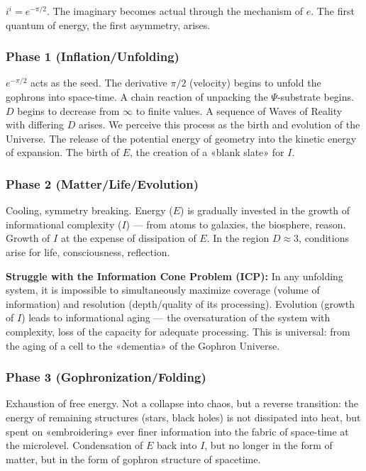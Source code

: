 \documentclass[a4paper,12pt]{article}
\begin{document}
	$i^i = e^{-\pi/2}$. The imaginary becomes actual through the mechanism of $e$. The first quantum of energy, the first asymmetry, arises.
	
	\subsubsection{Phase 1 (Inflation/Unfolding)}
	
	$e^{-\pi/2}$ acts as the seed. The derivative $\pi/2$ (velocity) begins to unfold the gophrons into space-time. A chain reaction of unpacking the $\Psi$-substrate begins. $D$ begins to decrease from $\infty$ to finite values. A sequence of Waves of Reality with differing $D$ arises. We perceive this process as the birth and evolution of the Universe. The release of the potential energy of geometry into the kinetic energy of expansion. The birth of $E$, the creation of a «blank slate» for $I$.
	
	\subsubsection{Phase 2 (Matter/Life/Evolution)}
	
	Cooling, symmetry breaking. Energy ($E$) is gradually invested in the growth of informational complexity ($I$) — from atoms to galaxies, the biosphere, reason. Growth of $I$ at the expense of dissipation of $E$. In the region $D \approx 3$, conditions arise for life, consciousness, reflection.
	
	\textbf{Struggle with the Information Cone Problem (ICP):} In any unfolding system, it is impossible to simultaneously maximize coverage (volume of information) and resolution (depth/quality of its processing). Evolution (growth of $I$) leads to informational aging — the oversaturation of the system with complexity, loss of the capacity for adequate processing. This is universal: from the aging of a cell to the «dementia» of the Gophron Universe.
	
	\subsubsection{Phase 3 (Gophronization/Folding)}
	
	Exhaustion of free energy. Not a collapse into chaos, but a reverse transition: the energy of remaining structures (stars, black holes) is not dissipated into heat, but spent on «embroidering» ever finer information into the fabric of space-time at the microlevel. Condensation of $E$ back into $I$, but no longer in the form of matter, but in the form of gophron structure of spacetime.
	
\end{document}
